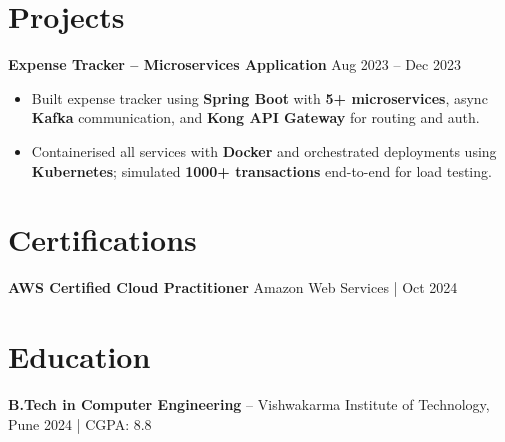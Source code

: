 \documentclass[a4paper,10pt]{article}
\begin{document}
\section*{Projects}

\textbf{Expense Tracker -- Microservices Application} \hfill Aug 2023 -- Dec 2023
\begin{itemize}[leftmargin=*]
    \item Built expense tracker using \textbf{Spring Boot} with \textbf{5+ microservices}, async \textbf{Kafka} communication, and \textbf{Kong API Gateway} for routing and auth.
    \item Containerised all services with \textbf{Docker} and orchestrated deployments using \textbf{Kubernetes}; simulated \textbf{1000+ transactions} end-to-end for load testing.
\end{itemize}

\section*{Certifications}
\textbf{AWS Certified Cloud Practitioner} \hfill Amazon Web Services \;|\; Oct 2024

\section*{Education}
\textbf{B.Tech in Computer Engineering} -- Vishwakarma Institute of Technology, Pune \hfill 2024 \;|\; CGPA: 8.8
\end{document}
